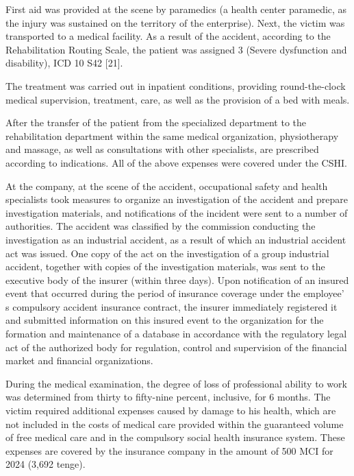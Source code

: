 \begin{multicols}{2}
First aid was provided at the scene by paramedics (a health center
paramedic, as the injury was sustained on the territory of the
enterprise). Next, the victim was transported to a medical facility. As
a result of the accident, according to the Rehabilitation Routing Scale,
the patient was assigned 3 (Severe dysfunction and disability), ICD 10
S42 {[}21{]}.

The treatment was carried out in inpatient conditions, providing
round-the-clock medical supervision, treatment, care, as well as the
provision of a bed with meals.

After the transfer of the patient from the specialized department to the
rehabilitation department within the same medical organization,
physiotherapy and massage, as well as consultations with other
specialists, are prescribed according to indications. All of the above
expenses were covered under the CSHI.

At the company, at the scene of the accident, occupational safety and
health specialists took measures to organize an investigation of the
accident and prepare investigation materials, and notifications of the
incident were sent to a number of authorities. The accident was
classified by the commission conducting the investigation as an
industrial accident, as a result of which an industrial accident act was
issued. One copy of the act on the investigation of a group industrial
accident, together with copies of the investigation materials, was sent
to the executive body of the insurer (within three days). Upon
notification of an insured event that occurred during the period of
insurance coverage under the employee' s compulsory
accident insurance contract, the insurer immediately registered it and
submitted information on this insured event to the organization for the
formation and maintenance of a database in accordance with the
regulatory legal act of the authorized body for regulation, control and
supervision of the financial market and financial organizations.

During the medical examination, the degree of loss of professional
ability to work was determined from thirty to fifty-nine percent,
inclusive, for 6 months. The victim required additional expenses caused
by damage to his health, which are not included in the costs of medical
care provided within the guaranteed volume of free medical care and in
the compulsory social health insurance system. These expenses are
covered by the insurance company in the amount of 500 MCI for 2024
(3,692 tenge).


\end{multicols}
